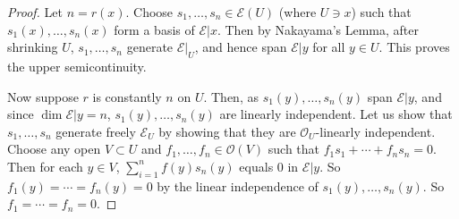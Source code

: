 \documentclass[11pt,b5paper,notitlepage]{article}
\theoremstyle{definition}
\theoremstyle{plain}
\newcommand{\scr}{\mathscr}
\numberwithin{equation}{section}
\begin{document}
\begin{proof}
Let $n=r(x)$. Choose $s_1,\dots,s_n\in\scr E(U)$ (where $U\ni x$) such that $s_1(x),\dots,s_n(x)$ form a basis of $\scr E|x$. Then by Nakayama's Lemma, after shrinking $U$, $s_1,\dots,s_n$ generate $\scr E|_U$, and hence span $\scr E|y$ for all $y\in U$. This proves the upper semicontinuity.

Now suppose $r$ is constantly $n$ on $U$. Then, as $s_1(y),\dots,s_n(y)$ span $\scr E|y$, and since $\dim\scr E|y=n$, $s_1(y),\dots,s_n(y)$ are linearly independent. Let us show that $s_1,\dots,s_n$ generate freely $\scr E_U$ by showing that they are $\scr O_U$-linearly independent. Choose any open $V\subset U$ and $f_1,\dots,f_n\in\scr O(V)$ such that $f_1s_1+\cdots+f_ns_n=0$. Then for each $y\in V$, $\sum_{i=1}^n f(y)s_n(y)$ equals $0$ in $\scr E|y$. So $f_1(y)=\cdots=f_n(y)=0$ by the linear independence of  $s_1(y),\dots,s_n(y)$. So $f_1=\cdots=f_n=0$.
\end{proof}
\end{document}
